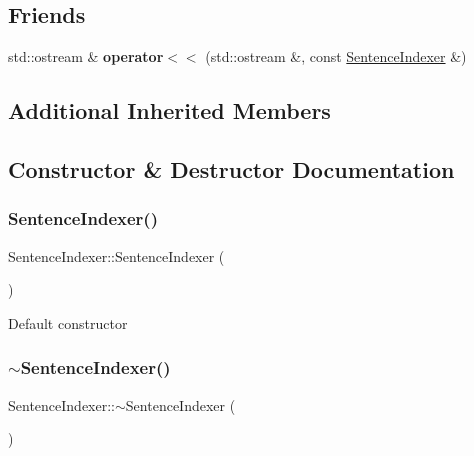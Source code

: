 \subsection*{Friends}
\begin{DoxyCompactItemize}
\item 
\mbox{\label{classSentenceIndexer_a28ba47a4a3b51dc012fa2f8fb194ab22}} 
std\+::ostream \& {\bfseries operator$<$$<$} (std\+::ostream \&, const \hyperlink{classSentenceIndexer}{Sentence\+Indexer} \&)
\end{DoxyCompactItemize}
\subsection*{Additional Inherited Members}


\subsection{Constructor \& Destructor Documentation}
\mbox{\label{classSentenceIndexer_a2ec9f359954191ebc5d84c759fd2238d}} 
\subsubsection{\texorpdfstring{Sentence\+Indexer()}{SentenceIndexer()}}
{\footnotesize\ttfamily Sentence\+Indexer\+::\+Sentence\+Indexer (\begin{DoxyParamCaption}{ }\end{DoxyParamCaption})}

Default constructor \mbox{\label{classSentenceIndexer_a3402eb910551128d0c8ecb33cf0bae42}} 
\subsubsection{\texorpdfstring{$\sim$\+Sentence\+Indexer()}{~SentenceIndexer()}}
{\footnotesize\ttfamily Sentence\+Indexer\+::$\sim$\+Sentence\+Indexer (\begin{DoxyParamCaption}{ }\end{DoxyParamCaption})\hspace{0.3cm}{\ttfamily [inline]}}

